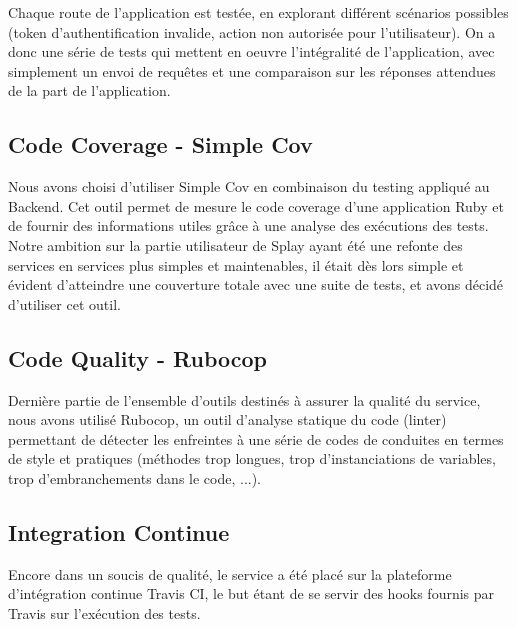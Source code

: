 \documentclass{eplmastersthesis}
\begin{document}
          Chaque route de l'application est testée, en explorant différent
          scénarios possibles (token d'authentification invalide, action
          non autorisée pour l'utilisateur). On a donc une série de tests
          qui mettent en oeuvre l'intégralité de l'application, avec simplement
          un envoi de requêtes et une comparaison sur les réponses attendues
          de la part de l'application.

      \subsection{Code Coverage - Simple Cov}

        Nous avons choisi d'utiliser Simple Cov en combinaison du testing appliqué
        au Backend. Cet outil permet de mesure le code coverage d'une application
        Ruby et de fournir des informations utiles grâce à une analyse des
        exécutions des tests.\\

        Notre ambition sur la partie utilisateur de Splay ayant été une refonte
        des services en services plus simples et maintenables, il était dès lors
        simple et évident d'atteindre une couverture totale avec une suite de tests,
        et avons décidé d'utiliser cet outil.

      \subsection{Code Quality - Rubocop}

        Dernière partie de l'ensemble d'outils destinés à assurer la qualité du
        service, nous avons utilisé Rubocop, un outil d'analyse statique du code
        (linter) permettant de détecter les enfreintes à une série de codes
        de conduites en termes de style et pratiques (méthodes trop longues,
        trop d'instanciations de variables, trop d'embranchements dans le code, ...).

      \subsection{Integration Continue}

        Encore dans un soucis de qualité, le service a été placé sur la plateforme
        d'intégration continue Travis CI, le but étant de se servir des hooks
        fournis par Travis sur l'exécution des tests.\\
\end{document}
